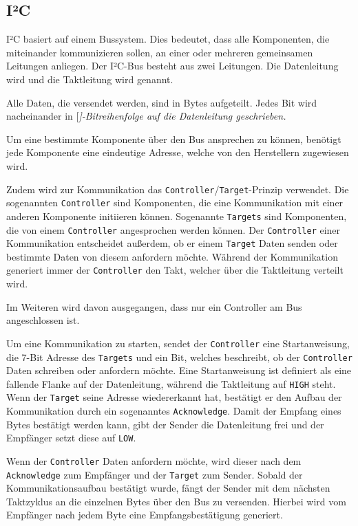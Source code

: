 \subsection{I²C}


I²C basiert auf einem Bussystem.
Dies bedeutet, dass alle Komponenten, die miteinander kommunizieren sollen, an einer oder mehreren gemeinsamen Leitungen anliegen.
Der I²C-Bus besteht aus zwei Leitungen.
Die Datenleitung wird  und die Taktleitung wird  genannt.

Alle Daten, die versendet werden, sind in Bytes aufgeteilt.
Jedes Bit wird nacheinander in [\itshape]-Bitreihenfolge auf die Datenleitung geschrieben.

Um eine bestimmte Komponente über den Bus ansprechen zu können, benötigt jede Komponente eine eindeutige Adresse, welche von den Herstellern zugewiesen wird.

Zudem wird zur Kommunikation das \texttt{Controller}/\texttt{Target}-Prinzip verwendet.
Die sogenannten \texttt{Controller} sind Komponenten, die eine Kommunikation mit einer anderen Komponente initiieren können.
Sogenannte \texttt{Targets} sind Komponenten, die von einem \texttt{Controller} angesprochen werden können.
Der \texttt{Controller} einer Kommunikation entscheidet außerdem, ob er einem \texttt{Target} Daten senden oder bestimmte Daten von diesem anfordern möchte.
Während der Kommunikation generiert immer der \texttt{Controller} den Takt, welcher über die Taktleitung verteilt wird.

Im Weiteren wird davon ausgegangen, dass nur ein Controller am Bus angeschlossen ist.

Um eine Kommunikation zu starten, sendet der \texttt{Controller} eine Startanweisung, die 7-Bit Adresse des \texttt{Targets} und ein Bit, welches beschreibt, ob der \texttt{Controller} Daten schreiben oder anfordern möchte.
Eine Startanweisung ist definiert als eine fallende Flanke auf der Datenleitung, während die Taktleitung auf \texttt{HIGH} steht.
Wenn der \texttt{Target} seine Adresse wiedererkannt hat, bestätigt er den Aufbau der Kommunikation durch ein sogenanntes \texttt{Acknowledge}.
Damit der Empfang eines Bytes bestätigt werden kann, gibt der Sender die Datenleitung frei und der Empfänger setzt diese auf \texttt{LOW}.

Wenn der \texttt{Controller} Daten anfordern möchte, wird dieser nach dem \texttt{Acknowledge} zum Empfänger und der \texttt{Target} zum Sender.
Sobald der Kommunikationsaufbau bestätigt wurde, fängt der Sender mit dem nächsten Taktzyklus an die einzelnen Bytes über den Bus zu versenden.
Hierbei wird vom Empfänger nach jedem Byte eine Empfangsbestätigung generiert.

